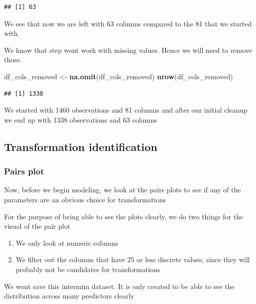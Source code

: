 \documentclass[
]{article}
\newenvironment{Shaded}{\begin{snugshade}}{\end{snugshade}}
\newcommand{\KeywordTok}[1]{\textcolor[rgb]{0.13,0.29,0.53}{\textbf{#1}}}
\newcommand{\NormalTok}[1]{#1}
\newcommand{\StringTok}[1]{\textcolor[rgb]{0.31,0.60,0.02}{#1}}
\providecommand{\tightlist}{%
  \setlength{\itemsep}{0pt}\setlength{\parskip}{0pt}}
\begin{document}
\begin{verbatim}
## [1] 63
\end{verbatim}

We see that now we are left with 63 columns compared to the 81 that we started with.

We know that step wont work with missing values. Hence we will need to remove those.

\begin{Shaded}
\begin{Highlighting}[]
\NormalTok{df_cols_removed <-}\StringTok{ }\KeywordTok{na.omit}\NormalTok{(df_cols_removed)}
\KeywordTok{nrow}\NormalTok{(df_cols_removed)}
\end{Highlighting}
\end{Shaded}

\begin{verbatim}
## [1] 1338
\end{verbatim}

We started with 1460 observations and 81 columns and after our initial cleanup we end up with 1338 observations and 63 columns

\hypertarget{transformation-identification}{%
\subsection{Transformation identification}\label{transformation-identification}}

\hypertarget{pairs-plot}{%
\subsubsection{Pairs plot}\label{pairs-plot}}

Now, before we begin modeling, we look at the pairs plots to see if any of the parameters are an obvious choice for transformations

For the purpose of being able to see the plots clearly, we do two things for the visual of the pair plot

\begin{enumerate}
\def\labelenumi{\arabic{enumi})}
\tightlist
\item
  We only look at numeric columns
\item
  We filter out the columns that have 25 or less discrete values, since they will probably not be candidates for transformations
\end{enumerate}

We wont save this intermim dataset. It is only created to be able to see the distribution across many predictors clearly
\end{document}
